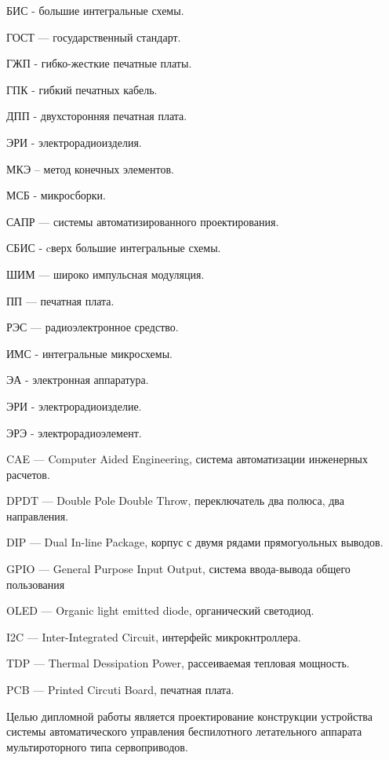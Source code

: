 \tableofcontents
\newpage





БИС - большие интегральные схемы.

ГОСТ — государственный стандарт.

ГЖП - гибко-жесткие печатные платы.

ГПК - гибкий печатных кабель.

ДПП - двухсторонняя печатная плата.

ЭРИ - электрорадиоизделия.

МКЭ – метод конечных элементов.

МСБ - микросборки.

САПР — системы автоматизированного проектирования.

СБИС - cверх большие интегральные схемы.

ШИМ — широко импульсная модуляция.

ПП — печатная плата.

РЭС — радиоэлектронное средство.

ИМС - интегральные микросхемы.

ЭА - электронная аппаратура.

ЭРИ - электрорадиоизделие.

ЭРЭ - электрорадиоэлемент.

CAE — Computer Aided Engineering, система автоматизации инженерных расчетов.

DPDT — Double Pole Double Throw, переключатель два полюса, два направления.

DIP — Dual In-line Package, корпус с двумя рядами
прямогуольных выводов.

GPIO — General Purpose Input Output, система ввода-вывода общего пользования

OLED — Organic light emitted diode, органический светодиод.

I2C — Inter-Integrated Circuit, интерфейс микрокнтроллера.

TDP — Thermal Dessipation Power, рассеиваемая тепловая мощность.

PCB — Printed Circuti Board, печатная плата.

\newpage


Целью дипломной работы является проектирование конструкции
устройства системы автоматического управления
беспилотного летательного аппарата мультироторного типа сервоприводов.

